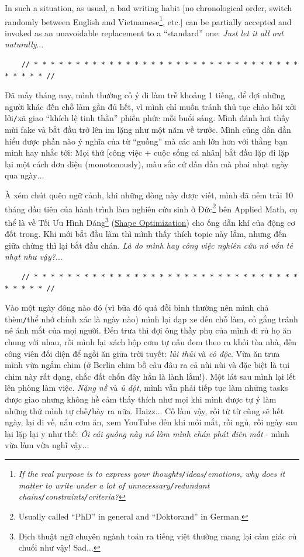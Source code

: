 \documentclass[12pt]{article}
\begin{document}
In such a situation, as usual, a bad writing habit [no chronological order, switch randomly between English and Vietnamese\footnote{{\it If the real purpose is to express your thoughts{\tt/}ideas{\tt/}emotions, why does it matter to write under a lot of unnecessary{\tt/}redundant chains{\tt/}constraints{\tt/}criteria?}}, etc.] can be partially accepted and invoked as an unavoidable replacement to a ``standard'' one: {\it Just let it all out naturally$\ldots$}

\begin{verbatim}
	// * * * * * * * * * * * * * * * * * * * * * * * * * * * * * * * * * * * * * //
\end{verbatim}

\noindent
{} Đã mấy tháng nay, mình thường cố ý đi làm trễ khoảng 1 tiếng, để đợi những người khác đến chỗ làm gần đủ hết, vì mình chỉ muốn tránh thủ tục chào hỏi xởi lởi{\tt/}xã giao ``khích lệ tinh thần'' phiền phức mỗi buổi sáng. Mình đánh hơi thấy mùi fake và bắt đầu trở lên im lặng như một năm về trước. Mình cũng dần dần hiểu được phần nào ý nghĩa của từ ``guồng'' mà các anh lớn hơn với thằng bạn mình hay nhắc tới: Mọi thứ [công việc + cuộc sống cá nhân] bắt đầu lặp đi lặp lại một cách đơn điệu (monotonously), màu sắc cứ dần dần mà phai nhạt ngày qua ngày$\ldots$

À xém chút quên ngữ cảnh, khi những dòng này được viết, mình đã nếm trải 10 tháng đầu tiên của hành trình làm nghiên cứu sinh ở Đức\footnote{Usually called ``PhD'' in general and ``Doktorand'' in German.} bên Applied Math, cụ thể là về Tối Ưu Hình Dáng\footnote{Dịch thuật ngữ chuyên ngành toán ra tiếng việt thường mang lại cảm giác củ chuối như vậy! Sad$\ldots$} (\href{https://en.wikipedia.org/wiki/Shape_optimization}{Shape Optimization}) cho ống dẫn khí của động cơ đốt trong. Khi mới bắt đầu làm thì mình thấy thích topic này lắm, nhưng đến giữa chừng thì lại bắt đầu chán. {\it Là do mình hay công việc nghiên cứu nó vốn tẻ nhạt như vậy?}$\ldots$

\begin{verbatim}
	// * * * * * * * * * * * * * * * * * * * * * * * * * * * * * * * * * * * * * //
\end{verbatim}

\noindent
{} Vào một ngày đông nào đó (vì bữa đó quá đỗi bình thường nên mình chả thèm{\tt/}thể nhớ chính xác là ngày nào) mình lại đạp xe đến chỗ làm, cố gắng tránh né ánh mắt của mọi người. Đến trưa thì đợi ông thầy phụ của mình đi rủ họ ăn chung với nhau, rồi mình lại xách hộp cơm tự nấu đem theo ra khỏi tòa nhà, đến công viên đối diện để ngồi ăn giữa trời tuyết: {\it lủi thủi} và {\it cô độc}. Vừa ăn trưa mình vừa ngắm chim (ở Berlin chim bồ câu đâu ra cả nùi nùi và đặc biệt là tụi chim này rất dạng, chắc đất chốn đây hẳn là lành lắm!). Một lát sau mình lại lết lên phòng làm việc. {\it Nặng nề} và {\it ủ dột}, mình vẫn phải tiếp tục làm những tasks được giao nhưng không hề cảm thấy thích như mọi khi mình được tự ý làm những thứ mình tự chế{\tt/}bày ra nữa. Haizz$\ldots$ Cố làm vậy, rồi từ từ cũng sẽ hết ngày, lại đi về, nấu cơm ăn, xem YouTube đến khi mỏi mắt, rồi ngủ, rồi ngày sau lại lặp lại y như thế: {\it Ôi cái guồng này nó làm mình chán phát điên mất} - mình vừa làm vừa nghĩ vậy$\ldots$
\end{document}
